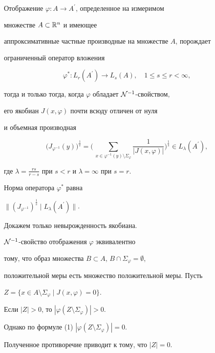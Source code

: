 \begin{prop}


Отображение $\varphi:A\to A^{\prime}$, определенное на измеримом


множестве $A\subset\Bbb R^n$ и имеющее


аппроксимативные частные производные на множестве $A$, порождает


ограниченный оператор вложения


$$


\varphi^{\ast} :


L_r(A^{\prime})\to L_s(A), \quad 1\leq s\leq r<\infty,


$$


тогда и только тогда, когда $\varphi$ обладает ${\cal N}^{-1}$-свойством,


его якобиан $J(x,\varphi)$ почти всюду отличен от нуля


и объемная производная


$$


\big(J_{\varphi^{-1}}(y)\big)^{\frac{1}{s}}=


\bigg(\,\sum\limits_{x\in\varphi^{-1}(y)\setminus\Sigma_{\varphi}}


\frac{1}{|J(x,\varphi)|}\bigg)^{\frac{1}{s}}\in L_{\lambda}(A^{\prime}),


$$


где $\lambda=\frac{rs}{r-s}$ при $s<r$ и $\lambda=\infty$ при $s=r$.


Норма оператора $\varphi^{\ast}$ равна


$\|(J_{\varphi^{-1}})^{\frac{1}{s}}\mid


L_\lambda(A^{\prime})\|$.


\end{prop}





\begin{pf}


Докажем только невырожденность якобиана.


${\cal N}^{-1}$-свойство отображения $\varphi$ эквивалентно


тому, что образ множества $B\subset A$, $B\cap \Sigma_{\varphi}=\emptyset$,


положительной меры есть множество положительной меры. Пусть


$Z=\{x\in A\setminus \Sigma_{\varphi}\mid J(x,\varphi)=0\}$.


Если $|Z|>0$, то $|\varphi(Z\setminus \Sigma_{\varphi})|>0$.


Однако по формуле (1) $|\varphi(Z\setminus \Sigma_{\varphi})|=0$.


Полученное противоречие приводит к тому, что $|Z|=0$.


\end{pf}





